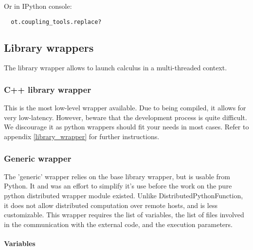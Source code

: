 Or in IPython console:
\begin{lstlisting}
  ot.coupling_tools.replace?
\end{lstlisting}



\cleardoublepage

\subsection{Library wrappers}

The library wrapper allows to launch calculus in a multi-threaded context.

\subsubsection{C++ library wrapper}

This is the most low-level wrapper available.
Due to being compiled, it allows for very low-latency.
However, beware that the development process is quite difficult.
We discourage it as python wrappers should fit your needs in most cases.
Refer to appendix \ref{library_wrapper} for further instructions.

\subsubsection{Generic wrapper}

The 'generic' wrapper relies on the base library wrapper, but is usable from Python. It and was an effort to simplify it's use before the work on the pure python distributed wrapper module existed. Unlike DistributedPythonFunction, it does not allow distributed computation over remote hosts, and is less customizable. This wrapper requires the list of variables, the list of files involved in the communication with the external code, and the execution parameters.

\paragraph{Variables}

